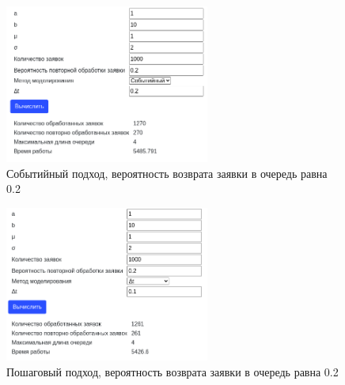 \begin{figure}[H]
    \centering
    \includegraphics[width=0.6\textwidth]{images/scr03.png}
    \caption{Событийный подход, вероятность возврата заявки в очередь равна 0.2}
\end{figure}
\begin{figure}[H]
    \centering
    \includegraphics[width=0.6\textwidth]{images/scr04.png}
    \caption{Пошаговый подход, вероятность возврата заявки в очередь равна 0.2}
\end{figure}


